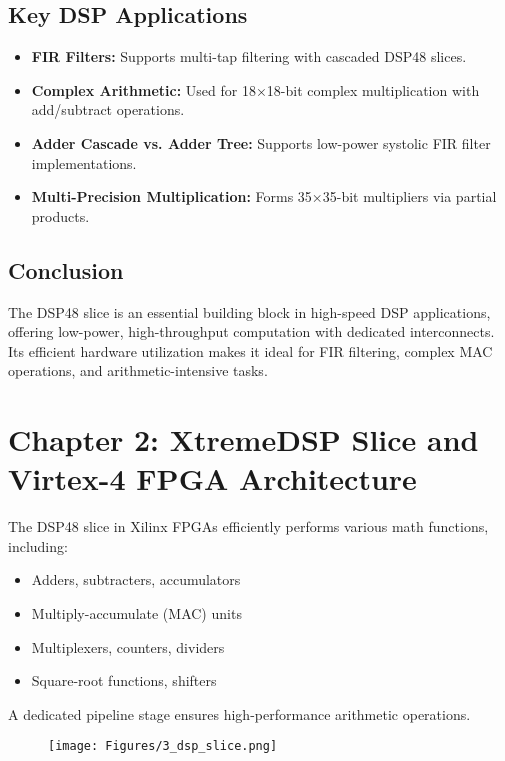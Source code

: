 \documentclass{article}
\begin{document}
	\subsection{Key DSP Applications}
	\begin{itemize}
		\item \textbf{FIR Filters:} Supports multi-tap filtering with cascaded DSP48 slices.
		\item \textbf{Complex Arithmetic:} Used for 18×18-bit complex multiplication with add/subtract operations.
		\item \textbf{Adder Cascade vs. Adder Tree:} Supports low-power systolic FIR filter implementations.
		\item \textbf{Multi-Precision Multiplication:} Forms 35×35-bit multipliers via partial products.
	\end{itemize}
	
	\subsection{Conclusion}
	The DSP48 slice is an essential building block in high-speed DSP applications, offering low-power, high-throughput computation with dedicated interconnects. Its efficient hardware utilization makes it ideal for FIR filtering, complex MAC operations, and arithmetic-intensive tasks.
	
	\newpage
	
	\section{Chapter 2: XtremeDSP Slice and Virtex-4 FPGA Architecture}
	The DSP48 slice in Xilinx FPGAs efficiently performs various math functions, including:
	\begin{itemize}
		\item Adders, subtracters, accumulators
		\item Multiply-accumulate (MAC) units
		\item Multiplexers, counters, dividers
		\item Square-root functions, shifters
	\end{itemize}
	A dedicated pipeline stage ensures high-performance arithmetic operations.
	
	\begin{figure}
		\centering
		\texttt{[image: Figures/3\_dsp\_slice.png]}
		\label{fig:enter-label}
	\end{figure}
	
\end{document}

